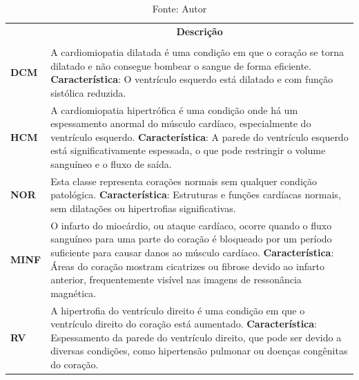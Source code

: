 \begin{table}[hbtp]
    \centering
    \renewcommand{\arraystretch}{1} %
    \begin{tabular}{|>{\centering\arraybackslash}p{2cm}|p{12cm}|}
    \hline 
          \multicolumn{1}{|c|}{\textbf{Condição}} & \multicolumn{1}{c|}{\textbf{Descrição}} \\
          & \\
    \hline 
        \textbf{DCM} &
        A cardiomiopatia dilatada é uma condição em que o coração se 
        torna dilatado e não consegue bombear o sangue de forma
        eficiente. 
        \newline \newline
        \textbf{Característica}: O ventrículo esquerdo está dilatado e com função sistólica reduzida. \\ 
    \hline
        \textbf{HCM} & 
        A cardiomiopatia hipertrófica é uma condição onde há um espessamento anormal do músculo cardíaco, especialmente do ventrículo esquerdo. 
        \newline \newline
        \textbf{Característica}: A parede do ventrículo esquerdo está significativamente espessada, o que pode restringir o volume sanguíneo e o fluxo de saída. \\ 
    \hline
        \textbf{NOR} & 
        Esta classe representa corações normais sem qualquer condição patológica. 
        \newline \newline
        \textbf{Característica}: Estruturas e funções cardíacas normais, sem dilatações ou hipertrofias significativas. \\ 
    \hline
        \textbf{MINF} & 
        O infarto do miocárdio, ou ataque cardíaco, ocorre quando o fluxo sanguíneo para uma parte do coração é bloqueado por um período suficiente para causar danos ao músculo cardíaco. 
        \newline \newline
        \textbf{Característica}: Áreas do coração mostram cicatrizes ou fibrose devido ao infarto anterior, frequentemente visível nas imagens de ressonância magnética. \\ 
    \hline
        \textbf{RV} & 
        A hipertrofia do ventrículo direito é uma condição em que o ventrículo direito do coração está aumentado. 
        \newline \newline
        \textbf{Característica}: Espessamento da parede do ventrículo direito, que pode ser devido a diversas condições, como hipertensão pulmonar ou doenças congênitas do coração. \\
    \hline
    \end{tabular} 
    \caption{Fonte: Autor}
    \label{tab:conditions}
\end{table}


